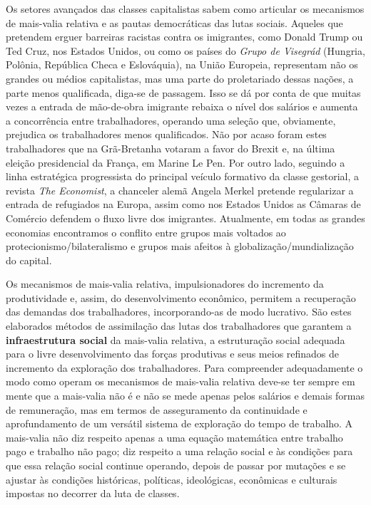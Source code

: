 Os setores avançados das classes capitalistas sabem como articular os
mecanismos de mais-valia relativa e as pautas democráticas das lutas
sociais. Aqueles que pretendem erguer barreiras racistas contra os
imigrantes, como Donald Trump ou Ted Cruz, nos Estados Unidos, ou como
os países do \emph{Grupo de Visegrád} (Hungria, Polônia, República Checa
e Eslováquia), na União Europeia, representam não os grandes ou médios
capitalistas, mas uma parte do proletariado dessas nações, a parte menos
qualificada, diga-se de passagem. Isso se dá por conta de que muitas
vezes a entrada de mão-de-obra imigrante rebaixa o nível dos salários e
aumenta a concorrência entre trabalhadores, operando uma seleção que,
obviamente, prejudica os trabalhadores menos qualificados. Não por acaso
foram estes trabalhadores que na Grã-Bretanha votaram a favor do Brexit
e, na última eleição presidencial da França, em Marine Le Pen. Por outro
lado, seguindo a linha estratégica progressista do principal veículo
formativo da classe gestorial, a revista \emph{The Economist}, a
chanceler alemã Angela Merkel pretende regularizar a entrada de
refugiados na Europa, assim como nos Estados Unidos as Câmaras de
Comércio defendem o fluxo livre dos imigrantes. Atualmente, em todas as
grandes economias encontramos o conflito entre grupos mais voltados ao
protecionismo/bilateralismo e grupos mais afeitos à
globalização/mundialização do capital.

Os mecanismos de mais-valia relativa, impulsionadores do incremento da
produtividade e, assim, do desenvolvimento econômico, permitem a
recuperação das demandas dos trabalhadores, incorporando-as de modo
lucrativo. São estes elaborados métodos de assimilação das lutas dos
trabalhadores que garantem a \textbf{infraestrutura social} da
mais-valia relativa, a estruturação social adequada para o livre
desenvolvimento das forças produtivas e seus meios refinados de
incremento da exploração dos trabalhadores. Para compreender
adequadamente o modo como operam os mecanismos de mais-valia relativa
deve-se ter sempre em mente que a mais-valia não é e não se mede apenas
pelos salários e demais formas de remuneração, mas em termos de
asseguramento da continuidade e aprofundamento de um versátil sistema de
exploração do tempo de trabalho. A mais-valia não diz respeito apenas a
uma equação matemática entre trabalho pago e trabalho não pago; diz
respeito a uma relação social e às condições para que essa relação
social continue operando, depois de passar por mutações e se ajustar às
condições históricas, políticas, ideológicas, econômicas e culturais
impostas no decorrer da luta de classes.

